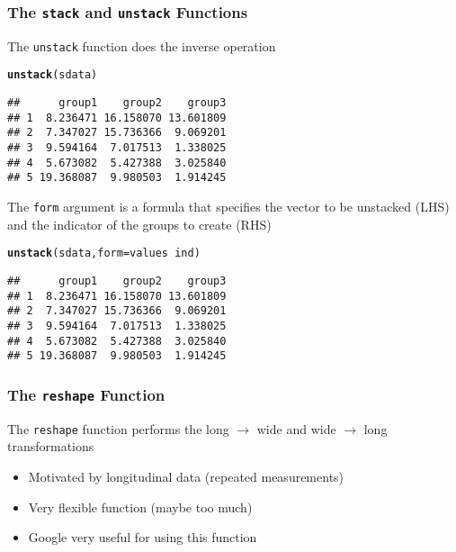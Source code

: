 \documentclass[paper=screen,mathserif]{beamer}\usepackage[]{graphicx}\usepackage[]{color}
\makeatletter
\newcommand{\hlopt}[1]{\textcolor[rgb]{0,0,0}{#1}}%
\newcommand{\hlstd}[1]{\textcolor[rgb]{0.345,0.345,0.345}{#1}}%
\newcommand{\hlkwc}[1]{\textcolor[rgb]{0.333,0.667,0.333}{#1}}%
\newcommand{\hlkwd}[1]{\textcolor[rgb]{0.737,0.353,0.396}{\textbf{#1}}}%
\newenvironment{kframe}{%
 \def\at@end@of@kframe{}%
 \ifinner\ifhmode%
  \def\at@end@of@kframe{\end{minipage}}%
  \begin{minipage}{\columnwidth}%
 \fi\fi%
 \def\FrameCommand##1{\hskip\@totalleftmargin \hskip-\fboxsep
 \colorbox{shadecolor}{##1}\hskip-\fboxsep
     \hskip-\linewidth \hskip-\@totalleftmargin \hskip\columnwidth}%
 \MakeFramed {\advance\hsize-\width
   \@totalleftmargin\z@ \linewidth\hsize
   \@setminipage}}%
 {\par\unskip\endMakeFramed%
 \at@end@of@kframe}
\newenvironment{knitrout}{}{} %
\newcommand{\ft}[1]{\frametitle{#1}}
\makeatother
\begin{document}
\begin{frame}[fragile]
  \ft{The {\tt stack} and {\tt unstack} Functions}
  
  The \verb=unstack= function does the inverse operation
\begin{knitrout}\scriptsize
{}\color{fgcolor}\begin{kframe}
\begin{alltt}
\hlkwd{unstack}\hlstd{(sdata)}
\end{alltt}
\begin{verbatim}
##      group1    group2    group3
## 1  8.236471 16.158070 13.601809
## 2  7.347027 15.736366  9.069201
## 3  9.594164  7.017513  1.338025
## 4  5.673082  5.427388  3.025840
## 5 19.368087  9.980503  1.914245
\end{verbatim}
\end{kframe}
\end{knitrout}
{\small The \verb=form= argument is a formula that specifies the
  vector to be unstacked (LHS) and the indicator of the groups to
  create (RHS)} 
\begin{knitrout}\scriptsize
{}\color{fgcolor}\begin{kframe}
\begin{alltt}
\hlkwd{unstack}\hlstd{(sdata,} \hlkwc{form} \hlstd{= values} \hlopt{~} \hlstd{ind)}
\end{alltt}
\begin{verbatim}
##      group1    group2    group3
## 1  8.236471 16.158070 13.601809
## 2  7.347027 15.736366  9.069201
## 3  9.594164  7.017513  1.338025
## 4  5.673082  5.427388  3.025840
## 5 19.368087  9.980503  1.914245
\end{verbatim}
\end{kframe}
\end{knitrout}
 
\end{frame}

\begin{frame}[fragile]
  \ft{The {\tt reshape} Function}
  
  The \verb=reshape= function performs the long $\rightarrow$ wide and
  wide $\rightarrow$ long transformations
  \begin{itemize}
  \item Motivated by longitudinal data (repeated measurements) 
  \item Very flexible function (maybe too much)
  \item {\color{gray} Google very useful for using this function} 
  \end{itemize}
\end{frame}
\end{document}
